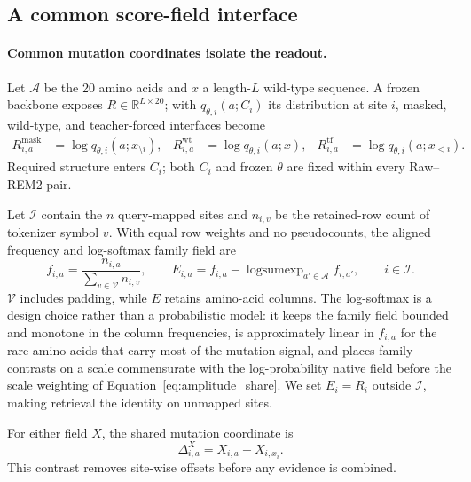\documentclass{article} %
\begin{document}
\begingroup
\setlength{\abovedisplayskip}{2pt plus 1pt minus 1pt}
\setlength{\belowdisplayskip}{2pt plus 1pt minus 1pt}
\setlength{\abovedisplayshortskip}{0pt plus 1pt}
\setlength{\belowdisplayshortskip}{1pt plus 1pt minus 1pt}
\setlength{\jot}{1pt}

\subsection{A common score-field interface}
\label{sec:interface}

\paragraph{Common mutation coordinates isolate the readout.}
Let $\mathcal A$ be the 20 amino acids and $x$ a length-$L$ wild-type sequence. A frozen backbone exposes $R\in\mathbb{R}^{L\times20}$; with $q_{\theta,i}(a;C_i)$ its distribution at site $i$, masked, wild-type, and teacher-forced interfaces become
\begin{equation}
\begin{aligned}
R^{\mathrm{mask}}_{i,a}&=\log q_{\theta,i}(a;x_{\setminus i}), &
R^{\mathrm{wt}}_{i,a}&=\log q_{\theta,i}(a;x), &
R^{\mathrm{tf}}_{i,a}&=\log q_{\theta,i}(a;x_{<i}).
\end{aligned}
\label{eq:readouts}
\end{equation}
Required structure enters $C_i$; both $C_i$ and frozen $\theta$ are fixed within every Raw--\textsc{REM2} pair.

\begin{samepage}
Let $\mathcal I$ contain the $n$ query-mapped sites and $n_{i,v}$ be the retained-row count of tokenizer symbol $v$. With equal row weights and no pseudocounts, the aligned frequency and log-softmax family field are
\begin{equation}
f_{i,a}=\frac{n_{i,a}}{\sum_{v\in\mathcal V}n_{i,v}},
\qquad
E_{i,a}=f_{i,a}-\operatorname{logsumexp}_{a'\in\mathcal A}f_{i,a'},
\qquad i\in\mathcal I.
\label{eq:family_field}
\end{equation}
$\mathcal V$ includes padding, while $E$ retains amino-acid columns. The log-softmax is a design choice rather than a probabilistic model: it keeps the family field bounded and monotone in the column frequencies, is approximately linear in $f_{i,a}$ for the rare amino acids that carry most of the mutation signal, and places family contrasts on a scale commensurate with the log-probability native field before the scale weighting of Equation~\ref{eq:amplitude_share}. We set $E_i=R_i$ outside $\mathcal I$, making retrieval the identity on unmapped sites.
\end{samepage}
For either field $X$, the shared mutation coordinate is
\begin{equation}
\Delta^X_{i,a}=X_{i,a}-X_{i,x_i}.
\label{eq:contrasts}
\end{equation}
This contrast removes site-wise offsets before any evidence is combined.
\end{document}
